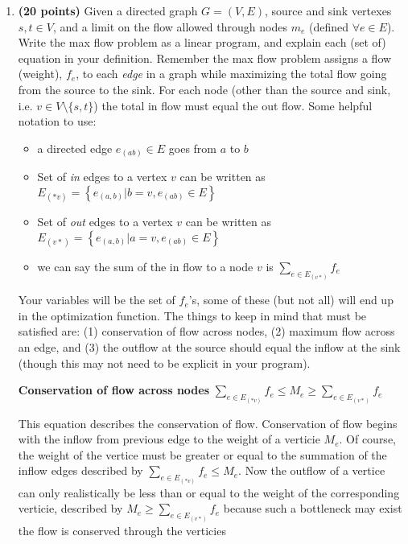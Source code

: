 \documentclass[11pt, oneside]{article}
\begin{document}
\begin{enumerate}
	\pagebreak


	\item \textbf{(20 points)}
	      Given a directed graph $G = (V,E)$, source and sink vertexes $s,t\in V$, and a limit on the flow allowed through nodes $m_e$ (defined $\forall e\in E$).
	      Write the max flow problem as a linear program, and explain each (set of) equation in your definition.
	      Remember the max flow problem assigns a flow (weight), $f_e$, to each \emph{edge} in a graph
	      while maximizing the total flow going from the source to the sink.
	      For each node (other than the source and sink, i.e. $v\in V\setminus\{s,t\}$)
	      the total in flow must equal the out flow.
	      Some helpful notation to use:
	      \begin{itemize}
		      \item a directed edge $e_{(ab)}\in E$ goes from $a$ to $b$
		      \item Set of \emph{in} edges to a vertex $v$  can be written as $E_{(*v)} = \left\{e_{(a,b)} | b = v,  e_{(ab)}\in E \right\}$
		      \item Set of \emph{out} edges to a vertex $v$  can be written as $E_{(v*)} = \left\{e_{(a,b)} | a = v, e_{(ab)}\in E\right\}$
		      \item we can say the sum of the in flow to a node $v$ is $\displaystyle\sum_{e \in E_{(v*)}} f_e$
	      \end{itemize}
	      Your variables will be the set of $f_e$'s, some of these (but not all) will end up in the optimization function.
	      The things to keep in mind that must be satisfied are:
	      (1) conservation of flow across nodes,
	      (2) maximum flow across an edge, and
	      (3) the outflow at the source should equal the inflow at the sink (though this may not need to be explicit in your program).

	\begin{center}
	\textbf{Conservation of flow across nodes}
	\linebreak
	\linebreak
	$\displaystyle\sum_{e \in E_{(*v)}}f_e \leq M_e \geq \displaystyle\sum_{e \in E_{(v*)}}f_e$ \end{center}

	This equation describes the conservation of flow. Conservation of flow begins with the inflow from previous edge to the weight of a verticie $M_e$. Of course, the weight of the vertice must be greater or equal to the summation of the inflow edges described by  $\displaystyle\sum_{e \in E_{(*v)}}f_e \leq M_e$. Now the outflow of a vertice can only realistically be less than or equal to the weight of the corresponding verticie, described by  $M_e \geq \displaystyle\sum_{e \in E_{(v*)}}f_e$ because such a bottleneck may exist the flow is conserved through the verticies
	\pagebreak


\end{enumerate}
\end{document}
